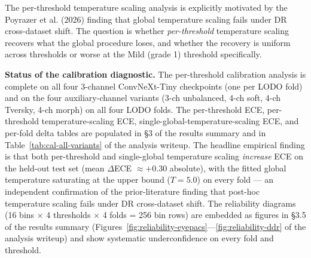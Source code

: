 \documentclass[11pt]{article}
\begin{document}
The per-threshold temperature scaling analysis is explicitly motivated by the Poyrazer et al. (2026) finding that global temperature scaling fails under DR cross-dataset shift. The question is whether \emph{per-threshold} temperature scaling recovers what the global procedure loses, and whether the recovery is uniform across thresholds or worse at the Mild (grade 1) threshold specifically.

\textbf{Status of the calibration diagnostic.} The per-threshold calibration analysis is complete on all four 3-channel ConvNeXt-Tiny checkpoints (one per LODO fold) and on the four auxiliary-channel variants (3-ch unbalanced, 4-ch soft, 4-ch Tversky, 4-ch morph) on all four LODO folds. The per-threshold ECE, per-threshold temperature-scaling ECE, single-global-temperature-scaling ECE, and per-fold delta tables are populated in §3 of the results summary and in Table~\ref{tab:cal-all-variants} of the analysis writeup. The headline empirical finding is that both per-threshold and single-global temperature scaling \emph{increase} ECE on the held-out test set (mean $\Delta$ECE $\approx +0.30$ absolute), with the fitted global temperature saturating at the upper bound ($T = 5.0$) on every fold --- an independent confirmation of the prior-literature finding that post-hoc temperature scaling fails under DR cross-dataset shift. The reliability diagrams (16 bins $\times$ 4 thresholds $\times$ 4 folds = 256 bin rows) are embedded as figures in §3.5 of the results summary (Figures~\ref{fig:reliability-eyepacs}---\ref{fig:reliability-ddr} of the analysis writeup) and show systematic underconfidence on every fold and threshold.
\end{document}
